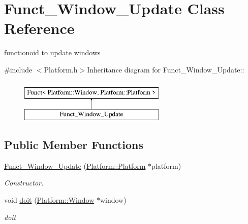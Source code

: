 \hypertarget{classFunct__Window__Update}{
\section{Funct\_\-Window\_\-Update Class Reference}
\label{classFunct__Window__Update}
}


functionoid to update windows  


{\ttfamily \#include $<$Platform.h$>$}Inheritance diagram for Funct\_\-Window\_\-Update::\begin{figure}[H]
\begin{center}
\leavevmode
\includegraphics[height=2cm]{classFunct__Window__Update}
\end{center}
\end{figure}
\subsection*{Public Member Functions}
\begin{DoxyCompactItemize}
\item 
\hypertarget{classFunct__Window__Update_a5534397837bac64addaac56cdea7821b}{
\hyperlink{classFunct__Window__Update_a5534397837bac64addaac56cdea7821b}{Funct\_\-Window\_\-Update} (\hyperlink{classPlatform_1_1Platform}{Platform::Platform} $\ast$platform)}
\label{classFunct__Window__Update_a5534397837bac64addaac56cdea7821b}

\begin{DoxyCompactList}\small\item\em Constructor. \item\end{DoxyCompactList}\item 
\hypertarget{classFunct__Window__Update_a0c0d99fe6a436de70f276e62b792898e}{
void \hyperlink{classFunct__Window__Update_a0c0d99fe6a436de70f276e62b792898e}{doit} (\hyperlink{classPlatform_1_1Window}{Platform::Window} $\ast$window)}
\label{classFunct__Window__Update_a0c0d99fe6a436de70f276e62b792898e}

\begin{DoxyCompactList}\small\item\em doit \item\end{DoxyCompactList}\end{DoxyCompactItemize}


